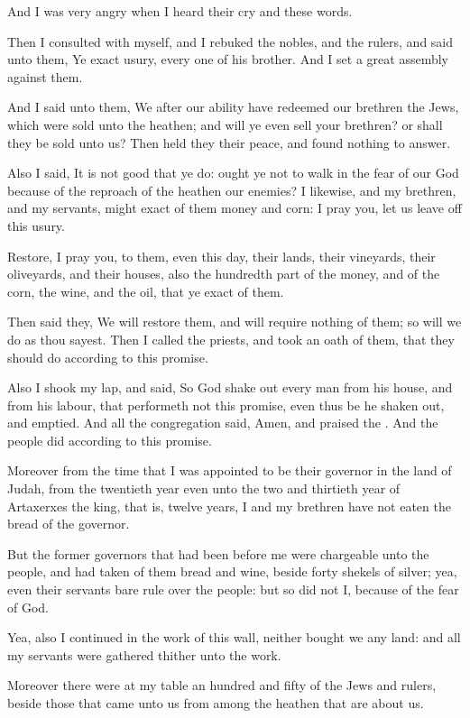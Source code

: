 \Verse And I was very angry when I heard their cry and these words.

\Verse Then I consulted with myself, and I rebuked the nobles, and the rulers, and said unto them, Ye exact usury, every one of his brother.  And I set a great assembly against them.

\Verse And I said unto them, We after our ability have redeemed our brethren the Jews, which were sold unto the heathen; and will ye even sell your brethren? or shall they be sold unto us? Then held they their peace, and found nothing to answer.

\Verse Also I said, It is not good that ye do: ought ye not to walk in the fear of our God because of the reproach of the heathen our enemies?  \Verse I likewise, and my brethren, and my servants, might exact of them money and corn: I pray you, let us leave off this usury.

\Verse Restore, I pray you, to them, even this day, their lands, their vineyards, their oliveyards, and their houses, also the hundredth part of the money, and of the corn, the wine, and the oil, that ye exact of them.

\Verse Then said they, We will restore them, and will require nothing of them; so will we do as thou sayest. Then I called the priests, and took an oath of them, that they should do according to this promise.

\Verse Also I shook my lap, and said, So God shake out every man from his house, and from his labour, that performeth not this promise, even thus be he shaken out, and emptied. And all the congregation said, Amen, and praised the \LORD. And the people did according to this promise.

\Verse Moreover from the time that I was appointed to be their governor in the land of Judah, from the twentieth year even unto the two and thirtieth year of Artaxerxes the king, that is, twelve years, I and my brethren have not eaten the bread of the governor.

\Verse But the former governors that had been before me were chargeable unto the people, and had taken of them bread and wine, beside forty shekels of silver; yea, even their servants bare rule over the people: but so did not I, because of the fear of God.

\Verse Yea, also I continued in the work of this wall, neither bought we any land: and all my servants were gathered thither unto the work.

\Verse Moreover there were at my table an hundred and fifty of the Jews and rulers, beside those that came unto us from among the heathen that are about us.

